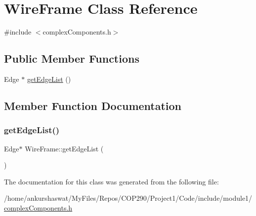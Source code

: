 \hypertarget{classWireFrame}{}\section{Wire\+Frame Class Reference}
\label{classWireFrame}


{\ttfamily \#include $<$complex\+Components.\+h$>$}

\subsection*{Public Member Functions}
\begin{DoxyCompactItemize}
\item 
Edge $\ast$ \hyperlink{classWireFrame_a05cebbd5f3da2cfaac0aab16afb708a9}{get\+Edge\+List} ()
\end{DoxyCompactItemize}


\subsection{Member Function Documentation}
\mbox{\label{classWireFrame_a05cebbd5f3da2cfaac0aab16afb708a9}} 
\subsubsection{\texorpdfstring{get\+Edge\+List()}{getEdgeList()}}
{\footnotesize\ttfamily Edge$\ast$ Wire\+Frame\+::get\+Edge\+List (\begin{DoxyParamCaption}{ }\end{DoxyParamCaption})}



The documentation for this class was generated from the following file\+:\begin{DoxyCompactItemize}
\item 
/home/ankurshaswat/\+My\+Files/\+Repos/\+C\+O\+P290/\+Project1/\+Code/include/module1/\hyperlink{complexComponents_8h}{complex\+Components.\+h}\end{DoxyCompactItemize}

